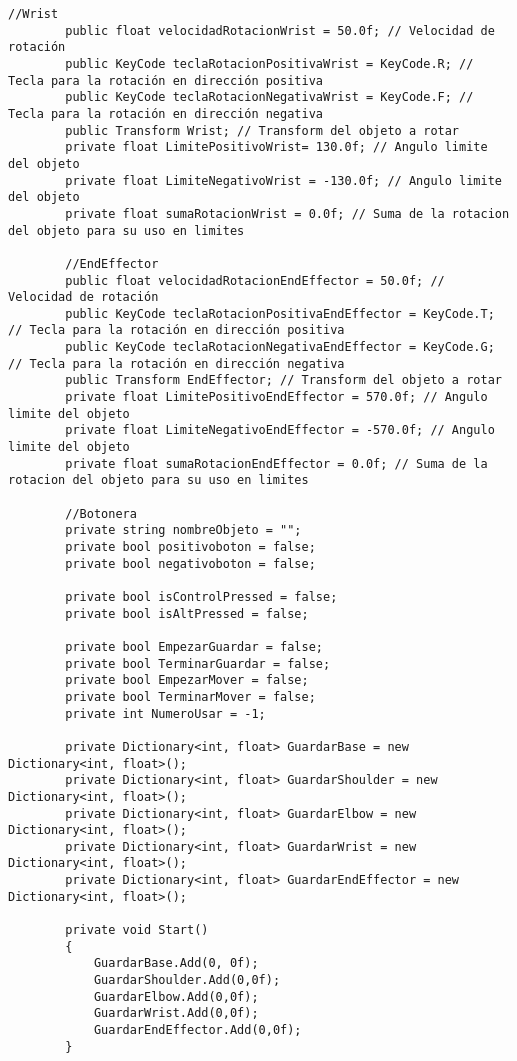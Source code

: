 \begin{lstlisting}[frame=single]
        //Wrist
        public float velocidadRotacionWrist = 50.0f; // Velocidad de rotación
        public KeyCode teclaRotacionPositivaWrist = KeyCode.R; // Tecla para la rotación en dirección positiva
        public KeyCode teclaRotacionNegativaWrist = KeyCode.F; // Tecla para la rotación en dirección negativa
        public Transform Wrist; // Transform del objeto a rotar
        private float LimitePositivoWrist= 130.0f; // Angulo limite del objeto
        private float LimiteNegativoWrist = -130.0f; // Angulo limite del objeto
        private float sumaRotacionWrist = 0.0f; // Suma de la rotacion del objeto para su uso en limites

        //EndEffector
        public float velocidadRotacionEndEffector = 50.0f; // Velocidad de rotación
        public KeyCode teclaRotacionPositivaEndEffector = KeyCode.T; // Tecla para la rotación en dirección positiva
        public KeyCode teclaRotacionNegativaEndEffector = KeyCode.G; // Tecla para la rotación en dirección negativa
        public Transform EndEffector; // Transform del objeto a rotar
        private float LimitePositivoEndEffector = 570.0f; // Angulo limite del objeto
        private float LimiteNegativoEndEffector = -570.0f; // Angulo limite del objeto
        private float sumaRotacionEndEffector = 0.0f; // Suma de la rotacion del objeto para su uso en limites

        //Botonera
        private string nombreObjeto = "";
        private bool positivoboton = false;
        private bool negativoboton = false;

        private bool isControlPressed = false;
        private bool isAltPressed = false;

        private bool EmpezarGuardar = false;
        private bool TerminarGuardar = false;
        private bool EmpezarMover = false;
        private bool TerminarMover = false;
        private int NumeroUsar = -1;

        private Dictionary<int, float> GuardarBase = new Dictionary<int, float>();
        private Dictionary<int, float> GuardarShoulder = new Dictionary<int, float>();
        private Dictionary<int, float> GuardarElbow = new Dictionary<int, float>();
        private Dictionary<int, float> GuardarWrist = new Dictionary<int, float>();
        private Dictionary<int, float> GuardarEndEffector = new Dictionary<int, float>();

        private void Start()
        {
            GuardarBase.Add(0, 0f);
            GuardarShoulder.Add(0,0f);
            GuardarElbow.Add(0,0f);
            GuardarWrist.Add(0,0f);
            GuardarEndEffector.Add(0,0f);
        }


\end{lstlisting}
